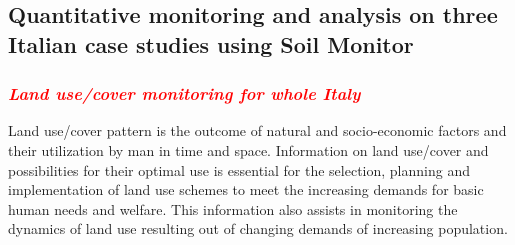 \documentclass[APA,LATO1COL,doublespace]{WileyNJD-v2}
\newcommand{\toberevised}[1]{\emph{\textcolor{red}{#1}}} %
\begin{document}
\subsection{Quantitative monitoring and analysis on three Italian case studies using Soil Monitor}\label{sec:caseStudies}
\subsubsection{\toberevised{Land use/cover monitoring for whole Italy}}

Land use/cover pattern is the outcome of natural and socio-economic factors and their utilization by man in time and space.
Information on land use/cover and possibilities for their optimal use is essential for the selection, planning and implementation of land use schemes to meet the increasing demands for basic human needs and welfare.
This information also assists in monitoring the dynamics of land use resulting out of changing demands of increasing population.
\end{document}
